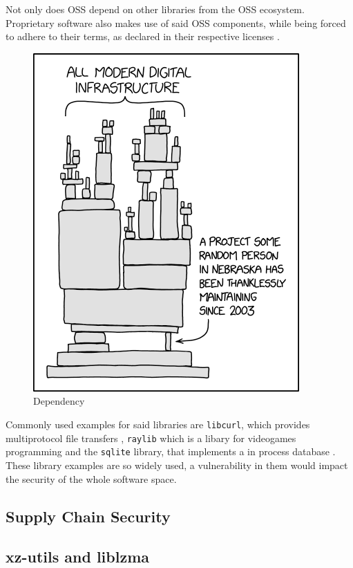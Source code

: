 Not only does OSS depend on other libraries from the OSS ecosystem. Proprietary
software also makes use of said OSS components, while being forced to adhere to
their terms, as declared in their respective licenses \cite{libcurl2024usage}. 


\begin{figure}[H]
    \includegraphics[scale=0.5]{assets/dependency.png}
    \caption{Dependency \cite{xkcdUnknownDependency}}
    \label{img:dependency}
\end{figure}

Commonly used examples for said libraries are \texttt{libcurl}, which provides
multiprotocol file transfers \cite{libcurl2024overview}, \texttt{raylib} which
is a libary for videogames programming \cite{raylib2024landing} and the
\texttt{sqlite} library, that implements a in process database
\cite{sqlite2024landing}. These library examples are so widely used, a
vulnerability in them would impact the security of the whole software space.

\subsection{Supply Chain Security}

\cite{ccc2024supplychainsec}

\subsection{xz-utils and liblzma}

\cite{ccc2024backdoor}
